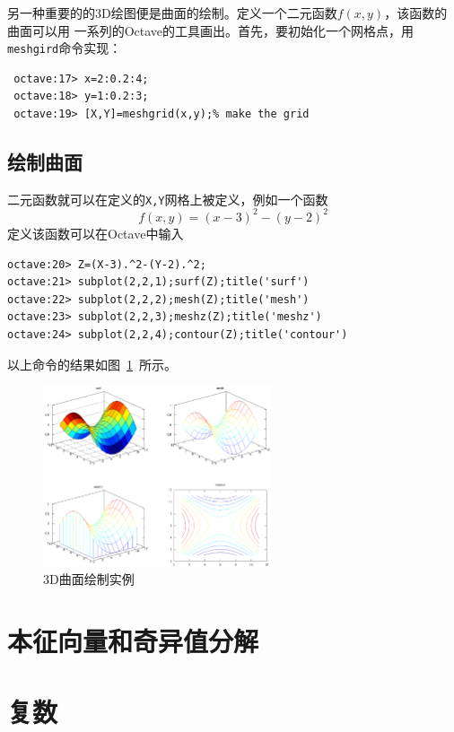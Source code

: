 \documentclass[UTF8,adobefonts]{ctexart}
\begin{document}
另一种重要的的3D绘图便是曲面的绘制。定义一个二元函数$f(x,y)$，该函数的曲面可以用
一系列的Octave的工具画出。首先，要初始化一个网格点，用{\tt meshgird}命令实现：
\begin{verbatim}
 octave:17> x=2:0.2:4;
 octave:18> y=1:0.2:3;
 octave:19> [X,Y]=meshgrid(x,y);% make the grid
\end{verbatim}

\subsection{绘制曲面}
二元函数就可以在定义的{\tt X,Y}网格上被定义，例如一个函数
\begin{equation}\nonumber
 f(x,y)=(x-3)^2-(y-2)^2
\end{equation}
定义该函数可以在Octave中输入
\begin{verbatim}
octave:20> Z=(X-3).^2-(Y-2).^2;
octave:21> subplot(2,2,1);surf(Z);title('surf')
octave:22> subplot(2,2,2);mesh(Z);title('mesh')
octave:23> subplot(2,2,3);meshz(Z);title('meshz')
octave:24> subplot(2,2,4);contour(Z);title('contour')
\end{verbatim}
以上命令的结果如图~\ref{surface}~所示。
\begin{figure}
 \centering
 \includegraphics[width=0.6\textwidth]{surface.eps}
 \caption{3D曲面绘制实例}
 \label{surface}
\end{figure}
\section{本征向量和奇异值分解}

\section{复数}
\end{document}
